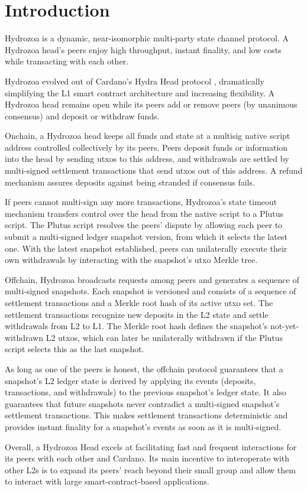 \documentclass[../hydrozoa.tex]{subfiles}
\begin{document}
\section*{Introduction}%
\label{h:introduction}


Hydrozoa is a dynamic, near-isomorphic multi-party state channel protocol.
A Hydrozoa head's peers enjoy high throughput, instant finality, and low costs while transacting with each other.

Hydrozoa evolved out of Cardano's Hydra Head protocol \citep{NagelEtAlHydraHeadV1Specification2024}, dramatically simplifying the L1 smart contract architecture and increasing flexibility.
A Hydrozoa head remains open while its peers add or remove peers (by unanimous consensus) and deposit or withdraw funds.

Onchain, a Hydrozoa head keeps all funds and state at a multisig native script address controlled collectively by its peers.
Peers deposit funds or information into the head by sending utxos to this address,
and withdrawals are settled by multi-signed settlement transactions that send utxos out of this address.
A refund mechanism assures deposits against being stranded if consensus fails.

If peers cannot multi-sign any more transactions, Hydrozoa's state timeout mechanism transfers control over the head from the native script to a Plutus script.
The Plutus script resolves the peers' dispute by allowing each peer to submit a multi-signed ledger snapshot version, from which it selects the latest one.
With the latest snapshot established, peers can unilaterally execute their own withdrawals by interacting with the snapshot's utxo Merkle tree.

Offchain, Hydrozoa broadcasts requests among peers and generates a sequence of multi-signed snapshots.
Each snapshot is versioned and consists of a sequence of settlement transactions and a Merkle root hash of its active utxo set.
The settlement transactions recognize new deposits in the L2 state and settle withdrawals from L2 to L1.
The Merkle root hash defines the snapshot's not-yet-withdrawn L2 utxos, which can later be unilaterally withdrawn if the Plutus script selects this as the last snapshot.

As long as one of the peers is honest, the offchain protocol guarantees that a snapshot's L2 ledger state is derived by applying its events (deposits, transactions, and withdrawals) to the previous snapshot's ledger state.
It also guarantees that future snapshots never contradict a multi-signed snapshot's settlement transactions.
This makes settlement transactions deterministic and provides instant finality for a snapshot's events as soon as it is multi-signed.

Overall, a Hydrozoa Head excels at facilitating fast and frequent interactions for its peers with each other and Cardano.
Its main incentive to interoperate with other L2s is to expand its peers' reach beyond their small group and allow them to interact with large smart-contract-based applications.

\end{document}
